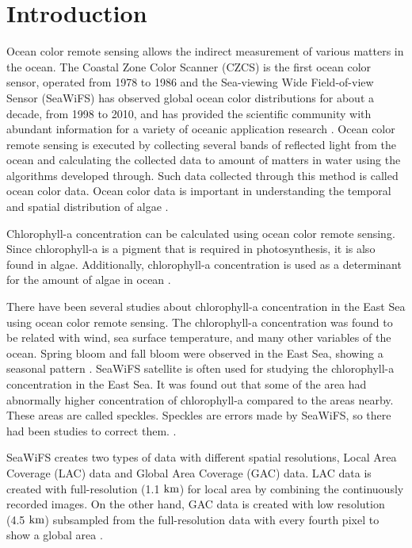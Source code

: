 \section{Introduction}

Ocean color remote sensing allows the indirect measurement of various matters in the ocean. The Coastal Zone Color Scanner (CZCS) is the first ocean color sensor, operated from 1978 to 1986 and the Sea-viewing Wide Field-of-view Sensor (SeaWiFS) has observed global ocean color distributions for about a decade, from 1998 to 2010, and has provided the scientific community with abundant information for a variety of oceanic application research \cite{kyung2013characteristics, hooker1992An}. Ocean color remote sensing is executed by collecting several bands of reflected light from the ocean and calculating the collected data to amount of matters in water using the algorithms developed through. Such data collected through this method is called ocean color data. Ocean color data is important in understanding the temporal and spatial distribution of algae \cite{kimhc2016surface}.

Chlorophyll-a concentration can be calculated using ocean color remote sensing. Since chlorophyll-a is a pigment that is required in photosynthesis, it is also found in algae. Additionally, chlorophyll-a concentration is used as a determinant for the amount of algae in ocean \cite{o2000ocean}. 

There have been several studies about chlorophyll-a concentration in the East Sea using ocean color remote sensing. The chlorophyll-a concentration was found to be related with wind, sea surface temperature, and many other variables of the ocean. Spring bloom and fall bloom were observed in the East Sea, showing a seasonal pattern \cite{yamada2004seasonal}. SeaWiFS satellite is often used for studying the chlorophyll-a concentration in the East Sea. It was found out that some of the area had abnormally higher concentration of chlorophyll-a compared to the areas nearby. These areas are called speckles. Speckles are errors made by SeaWiFS, so there had been studies to correct them. \cite{chae2009characteristics}. 

SeaWiFS creates two types of data with different spatial resolutions, Local Area Coverage (LAC) data and Global Area Coverage (GAC) data. LAC data is created with full-resolution (1.1 $\rm km$) for local area by combining the continuously recorded images. On the other hand, GAC data is created with low resolution (4.5 $\rm km$) subsampled from the full-resolution data with every fourth pixel to show a global area \cite{Seawifsres}. 

